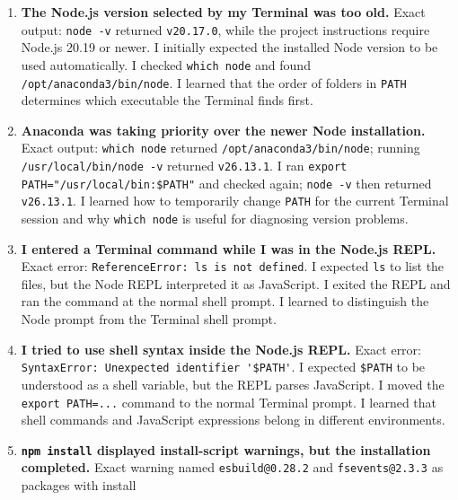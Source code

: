 \documentclass[
]{article}
\newcommand{\passthrough}[1]{#1}
\providecommand{\tightlist}{%
  \setlength{\itemsep}{0pt}\setlength{\parskip}{0pt}}
\begin{document}
\begin{enumerate}
\def\labelenumi{\arabic{enumi}.}
\tightlist
\item
  \textbf{The Node.js version selected by my Terminal was too old.}
  Exact output: \passthrough{\lstinline!node -v!} returned
  \passthrough{\lstinline!v20.17.0!}, while the project instructions
  require Node.js 20.19 or newer. I initially expected the installed
  Node version to be used automatically. I checked
  \passthrough{\lstinline!which node!} and found
  \passthrough{\lstinline!/opt/anaconda3/bin/node!}. I learned that the
  order of folders in \passthrough{\lstinline!PATH!} determines which
  executable the Terminal finds first.
\item
  \textbf{Anaconda was taking priority over the newer Node
  installation.} Exact output: \passthrough{\lstinline!which node!}
  returned \passthrough{\lstinline!/opt/anaconda3/bin/node!}; running
  \passthrough{\lstinline!/usr/local/bin/node -v!} returned
  \passthrough{\lstinline!v26.13.1!}. I ran
  \passthrough{\lstinline!export PATH="/usr/local/bin:$PATH"!} and
  checked again; \passthrough{\lstinline!node -v!} then returned
  \passthrough{\lstinline!v26.13.1!}. I learned how to temporarily
  change \passthrough{\lstinline!PATH!} for the current Terminal session
  and why \passthrough{\lstinline!which node!} is useful for diagnosing
  version problems.
\item
  \textbf{I entered a Terminal command while I was in the Node.js REPL.}
  Exact error:
  \passthrough{\lstinline!ReferenceError: ls is not defined!}. I
  expected \passthrough{\lstinline!ls!} to list the files, but the Node
  REPL interpreted it as JavaScript. I exited the REPL and ran the
  command at the normal shell prompt. I learned to distinguish the Node
  prompt from the Terminal shell prompt.
\item
  \textbf{I tried to use shell syntax inside the Node.js REPL.} Exact
  error:
  \passthrough{\lstinline!SyntaxError: Unexpected identifier '$PATH'!}.
  I expected \passthrough{\lstinline!$PATH!} to be understood as a shell
  variable, but the REPL parses JavaScript. I moved the
  \passthrough{\lstinline!export PATH=...!} command to the normal
  Terminal prompt. I learned that shell commands and JavaScript
  expressions belong in different environments.
\item
  \textbf{\passthrough{\lstinline!npm install!} displayed install-script
  warnings, but the installation completed.} Exact warning named
  \passthrough{\lstinline!esbuild@0.28.2!} and
  \passthrough{\lstinline!fsevents@2.3.3!} as packages with install

\end{enumerate}
\end{document}
